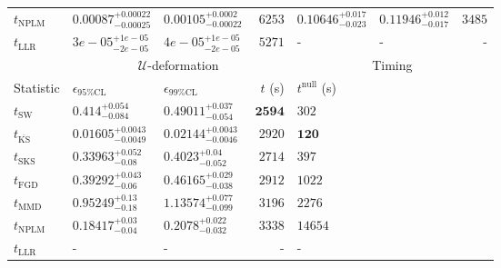 \begin{tabular}{l|llr|llr}
\rowcolor{red!35}	$t_{\mathrm{NPLM}}$ & $0.00087_{-0.00025}^{+0.00022}$ & $0.00105_{-0.00022}^{+0.0002}$ & $6253$ & $0.10646_{-0.023}^{+0.017}$ & $0.11946_{-0.017}^{+0.012}$ & $3485$ \\
	$t_{\mathrm{LLR}}$ & $3e-05_{-2e-05}^{+1e-05}$ & $4e-05_{-2e-05}^{+1e-05}$ & $5271$ & - & - & - \\
	\toprule
	\multicolumn{1}{c}{} & \multicolumn{3}{c}{$\mathcal{U}$-deformation} & \multicolumn{3}{c}{Timing} \\
	Statistic & $\epsilon_{95\%\mathrm{CL}}$ & $\epsilon_{99\%\mathrm{CL}}$ & $t$ (s) & $t^{\mathrm{null}}$ (s) \\
	\midrule
	$t_{\mathrm{SW}}$ & $0.414_{-0.084}^{+0.054}$ & $0.49011_{-0.054}^{+0.037}$ & ${\mathbf{2594}}$ & $302$ \\
	$t_{\overline{\mathrm{KS}}}$ & ${\mathbf{0.01605_{-0.0049}^{+0.0043}}}$ & ${\mathbf{0.02144_{-0.0046}^{+0.0043}}}$ & $2920$ & ${\mathbf{120}}$ \\
	$t_{\mathrm{SKS}}$ & $0.33963_{-0.08}^{+0.052}$ & $0.4023_{-0.052}^{+0.04}$ & $2714$ & $397$ \\
	$t_{\mathrm{FGD}}$ & $0.39292_{-0.06}^{+0.043}$ & $0.46165_{-0.038}^{+0.029}$ & $2912$ & $1022$ \\
	$t_{\mathrm{MMD}}$ & $0.95249_{-0.18}^{+0.13}$ & $1.13574_{-0.099}^{+0.077}$ & $3196$ & $2276$ \\
\rowcolor{red!35}	$t_{\mathrm{NPLM}}$ & $0.18417_{-0.04}^{+0.03}$ & $0.2078_{-0.032}^{+0.022}$ & $3338$ & $14654$ \\
	$t_{\mathrm{LLR}}$ & - & - & - & - \\
	\bottomrule
\end{tabular}